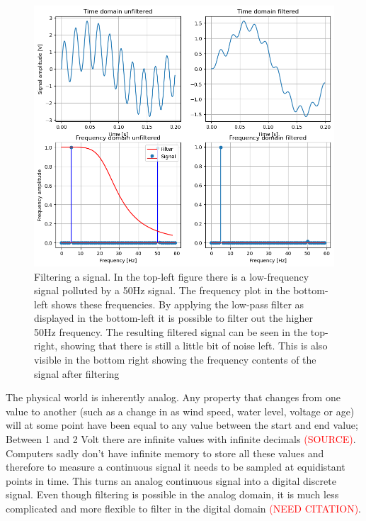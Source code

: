 \begin{figure}[h!t]
	\begin{center}
		\includegraphics[width=1.0\columnwidth]{images/filter_example.png}
	\end{center}
	\caption{Filtering a signal. In the top-left figure there is a low-frequency signal polluted by a 50Hz signal. The frequency plot in the bottom-left shows these frequencies. By applying the low-pass filter as displayed in the bottom-left it is possible to filter out the higher 50Hz frequency. The resulting filtered signal can be seen in the top-right, showing that there is still a little bit of noise left. This is also visible in the bottom right showing the frequency contents of the signal after filtering}
	\label{fig:filter_example}
\end{figure}

The physical world is inherently analog. Any property that changes from one value to another (such as a change in as wind speed, water level, voltage or age) will at some point have been equal to any value between the start and end value; Between 1 and 2 Volt there are infinite values with infinite decimals \textcolor{red}{(SOURCE)}. Computers sadly don't have infinite memory to store all these values and therefore to measure a continuous signal it needs to be sampled at equidistant points in time. This turns an analog continuous signal into a digital discrete signal. Even though filtering is possible in the analog domain, it is much less complicated and more flexible to filter in the digital domain \textcolor{red}{(NEED CITATION)}.

